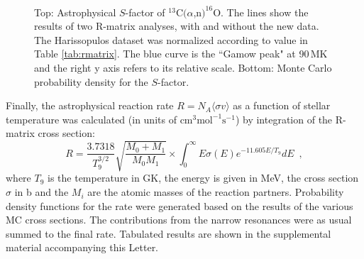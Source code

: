 \documentclass[%
reprint,
groupedaddress,
showpacs,
nofootinbib,
amsmath,amssymb,
aps,
prl,
superscriptaddress,
notitlepage,
floatfix
]{revtex4-2}
\begin{document}
\begin{figure}[tb]
    \centering
    \\
    \caption{Top: Astrophysical $S$-factor of $^{13}$C$(\alpha$,n$)^{16}$O. The lines show the results of two R-matrix analyses, with and without the new data. The Harissopulos dataset was normalized according to value in Table \ref{tab:rmatrix}. The blue curve is the ``Gamow peak" at 90\,MK and the right y axis refers to its relative scale. Bottom: Monte Carlo probability density for the $S$-factor.}
    \label{fig:sfactor}
\end{figure}

Finally, the astrophysical reaction rate $R = N_A\langle\sigma v\rangle$ as a function of stellar temperature was calculated (in units of $\text{cm}^3 \text{mol}^{-1} \text{s}^{-1}$) by integration of the R-matrix cross section:
\begin{equation}
    \label{eq:rate}
    R = \frac{3.7318}{T_9^{3/2}} \sqrt{\frac{M_0 + M_1}{M_0 M_1}} \times \int_0^{\infty} E \sigma(E) e^{-11.605 E/T_9} dE \enspace,
\end{equation}
where $T_9$ is the temperature in GK, the energy is given in MeV, the cross section $\sigma$ in b and the $M_i$ are the atomic masses of the reaction partners. Probability density functions for the rate were generated based on the results of the various MC cross sections. The contributions from the narrow resonances were as usual summed to the final rate. Tabulated results are shown in the supplemental material accompanying this Letter.
\end{document}
